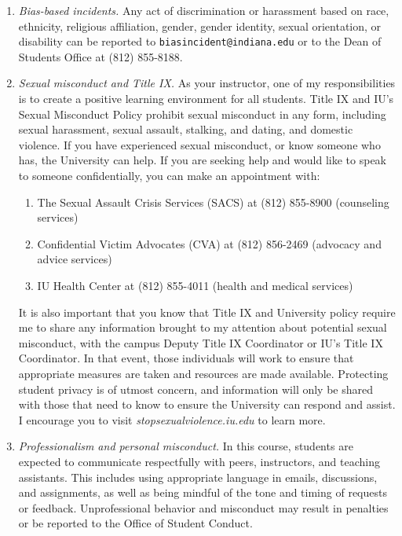 \documentclass[11pt,article,oneside]{memoir} %
\begin{document}
\begin{enumerate}
\item \emph{Bias-based incidents.} Any act of discrimination or harassment based on 
race, ethnicity, religious affiliation, gender, gender identity, sexual orientation, or
disability can be reported to \texttt{biasincident@indiana.edu} or to the Dean of Students Office at (812) 855-8188. 

\item \emph{Sexual misconduct and Title IX.} As your instructor, one of my
responsibilities is to create a positive learning environment for all students.
Title IX and IU's Sexual Misconduct Policy prohibit sexual misconduct in any
form, including sexual harassment, sexual assault, stalking, and dating, and
domestic violence.  If you have experienced sexual misconduct, or know someone
who has, the University can help. If you are seeking help and would like to
speak to someone confidentially, you can make an appointment with:

\begin{enumerate}

\item The Sexual Assault Crisis Services (SACS) at (812) 855-8900 (counseling services)
\item Confidential Victim Advocates (CVA) at (812) 856-2469 (advocacy and advice services)
\item IU Health Center at (812) 855-4011 (health and medical services)

\end{enumerate}

It is also important that you know that Title IX and University policy require
me to share any information brought to my attention about potential sexual
misconduct, with the campus Deputy Title IX Coordinator or IU's Title IX
Coordinator. In that event, those individuals will work to ensure that
appropriate measures are taken and resources are made available. Protecting
student privacy is of utmost concern, and information will only be shared with
those that need to know to ensure the University can respond and assist. I
encourage you to visit \emph{stopsexualviolence.iu.edu} to learn more.

\item \emph{Professionalism and personal misconduct.} In this course, students are expected to communicate respectfully with peers, instructors, and teaching assistants. This includes using appropriate language in emails, discussions, and assignments, as well as being mindful of the tone and timing of requests or feedback. Unprofessional behavior and misconduct may result in penalties or be reported to the Office of Student Conduct.  

\end{enumerate}

\end{document}
